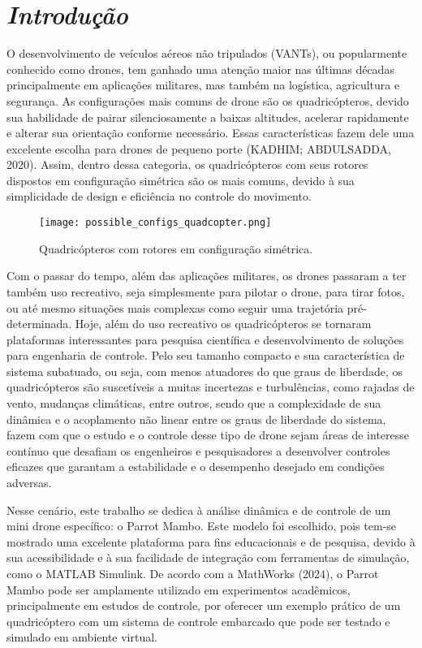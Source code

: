 \chapter{\textit{Introdução}}

O desenvolvimento de veículos aéreos não tripulados (VANTs), ou popularmente conhecido como drones, tem ganhado uma atenção maior nas últimas décadas principalmente em aplicações militares, mas também na logística, agricultura e segurança. As configurações mais comuns de drone são os quadricópteros, devido sua habilidade de pairar silenciosamente a baixas altitudes, acelerar rapidamente e alterar sua orientação conforme necessário. Essas características fazem dele uma excelente escolha para drones de pequeno porte (KADHIM; ABDULSADDA, 2020). Assim, dentro dessa categoria, os quadricópteros com seus rotores dispostos em configuração simétrica são os mais comuns, devido à sua simplicidade de design e eficiência no controle do movimento.

\begin{figure}[H]
	\centering
	\texttt{[image: possible\_configs\_quadcopter.png]}
	\caption{Quadricópteros com rotores em configuração simétrica.}
	\centering
	\label{multiple drone rotor configuration}
\end{figure}


Com o passar do tempo, além das aplicações militares, os drones passaram a ter também uso recreativo, seja simplesmente para pilotar o drone, para tirar fotos, ou até mesmo situações mais complexas como seguir uma trajetória pré-determinada. Hoje, além do uso recreativo os quadricópteros se tornaram plataformas interessantes para pesquisa científica e desenvolvimento de soluções para engenharia de controle.  Pelo seu tamanho compacto e sua característica de sistema subatuado, ou seja, com menos atuadores do que graus de liberdade, os quadricópteros são suscetíveis a muitas incertezas e turbulências, como rajadas de vento, mudanças climáticas, entre outros,
sendo que a complexidade de sua dinâmica e o acoplamento não linear entre os graus de liberdade do sistema, fazem com que o estudo e o controle desse tipo de drone sejam áreas de interesse contínuo que desafiam os engenheiros e pesquisadores a desenvolver controles eficazes que garantam a estabilidade e o desempenho desejado em condições adversas.

Nesse cenário, este trabalho se dedica à análise dinâmica e de controle de um mini drone específico: o Parrot Mambo. Este modelo foi escolhido, pois tem-se mostrado uma excelente plataforma para fins educacionais e de pesquisa, devido à sua acessibilidade e à sua facilidade de integração com ferramentas de simulação, como o MATLAB Simulink. De acordo com a MathWorks (2024), o Parrot Mambo pode ser amplamente utilizado em experimentos acadêmicos, principalmente em estudos de controle, por oferecer um exemplo prático de um quadricóptero com um sistema de controle embarcado que pode ser testado e simulado em ambiente virtual.

